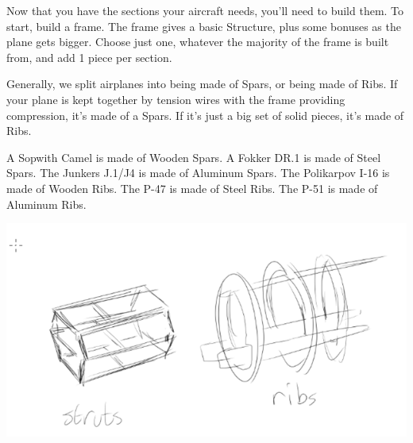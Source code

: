 \documentclass{article}
\begin{document}
Now that you have the sections your aircraft needs, you'll need to build
them. To start, build a frame. The frame gives a basic Structure, plus
some bonuses as the plane gets bigger. Choose just one, whatever the
majority of the frame is built from, and add 1 piece per section.

Generally, we split airplanes into being made of Spars, or being made of
Ribs. If your plane is kept together by tension wires with the frame
providing compression, it's made of a Spars. If it's just a big set of
solid pieces, it's made of Ribs.

A Sopwith Camel is made of Wooden Spars. A Fokker DR.1 is made of
Steel Spars. The Junkers J.1/J4 is made of Aluminum Spars. The
Polikarpov I-16 is made of Wooden Ribs. The P-47 is made of Steel Ribs.
The P-51 is made of Aluminum Ribs.

\includegraphics{Frame.png}
\end{document}
